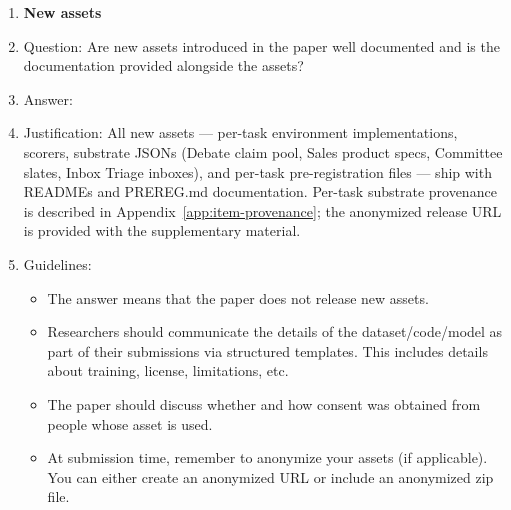 \documentclass{article}
\begin{document}
\begin{enumerate}
\item {\bf New assets}
    \item[] Question: Are new assets introduced in the paper well documented and is the documentation provided alongside the assets?
    \item[] Answer: \answerYes{} %
    \item[] Justification: All new assets --- per-task environment implementations, scorers, substrate JSONs (Debate claim pool, Sales product specs, Committee slates, Inbox Triage inboxes), and per-task pre-registration files --- ship with READMEs and PREREG.md documentation. Per-task substrate provenance is described in Appendix~\ref{app:item-provenance}; the anonymized release URL is provided with the supplementary material.
    \item[] Guidelines:
    \begin{itemize}
        \item The answer \answerNA{} means that the paper does not release new assets.
        \item Researchers should communicate the details of the dataset\slash code\slash model as part of their submissions via structured templates. This includes details about training, license, limitations, etc. 
        \item The paper should discuss whether and how consent was obtained from people whose asset is used.
        \item At submission time, remember to anonymize your assets (if applicable). You can either create an anonymized URL or include an anonymized zip file.
    \end{itemize}


\end{enumerate}
\end{document}
